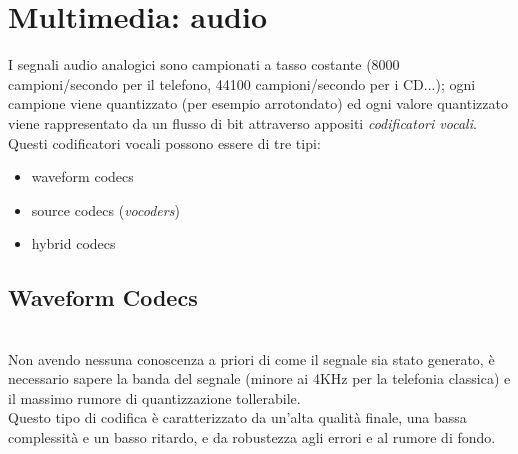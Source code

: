 \section{Multimedia: audio}
I segnali audio analogici sono campionati a tasso costante (8000 campioni/secondo per il telefono, 44100 campioni/secondo per i CD...); ogni campione viene quantizzato (per esempio arrotondato) ed ogni valore quantizzato viene rappresentato da un flusso di bit attraverso appositi \textit{codificatori vocali}.\\
Questi codificatori vocali possono essere di tre tipi:
\begin{itemize}
	\item waveform codecs
	\item source codecs (\textit{vocoders})
	\item hybrid codecs
\end{itemize}

\subsection{Waveform Codecs}\hfill\\
Non avendo nessuna conoscenza a priori di come il segnale sia stato generato, è necessario sapere la banda del segnale (minore ai 4KHz per la telefonia classica) e il massimo rumore di quantizzazione tollerabile.\\
Questo tipo di codifica è caratterizzato da un'alta qualità finale, una bassa complessità e un basso ritardo, e da robustezza agli errori e al rumore di fondo.

